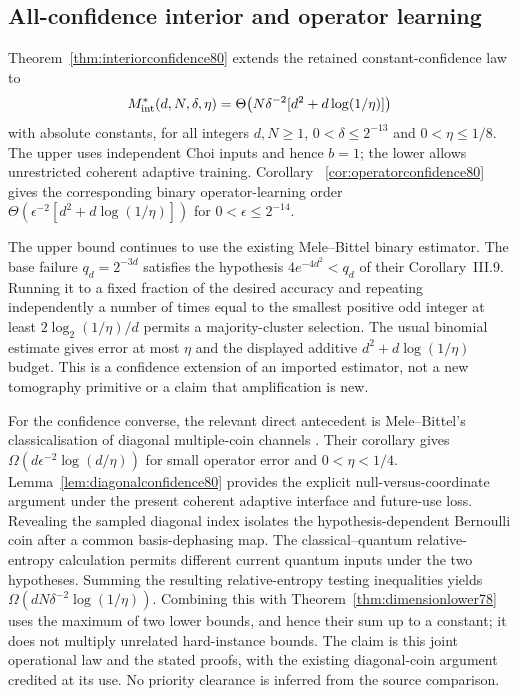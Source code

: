 \subsection{All-confidence interior and operator learning}
Theorem~\ref{thm:interiorconfidence80} extends the retained
constant-confidence law to
\[
 M^*_{\rm int}(d,N,\delta,\eta)
 =\Theta\!\left(N\delta^{-2}
             [d^2+d\log(1/\eta)]\right)
\]
with absolute constants, for all integers $d,N\ge1$,
$0<\delta\le2^{-13}$ and $0<\eta\le1/8$.
The upper uses independent Choi inputs and hence $b=1$; the lower
allows unrestricted coherent adaptive training. Corollary~
\ref{cor:operatorconfidence80} gives the corresponding binary
operator-learning order
$\Theta(\epsilon^{-2}[d^2+d\log(1/\eta)])$ for
$0<\epsilon\le2^{-14}$.

The upper bound continues to use the existing Mele--Bittel binary
estimator. The base failure $q_d=2^{-3d}$ satisfies the hypothesis
$4e^{-4d^2}<q_d$ of their Corollary~III.9. Running it to a fixed
fraction of the desired accuracy and repeating independently a number of times equal to the smallest positive odd
integer at least $2\log_2(1/\eta)/d$ permits a majority-cluster
selection. The usual binomial estimate gives error at most $\eta$
and the displayed additive $d^2+d\log(1/\eta)$ budget. This is a
confidence extension of an imported estimator, not a new tomography
primitive or a claim that amplification is new.

For the confidence converse, the relevant direct antecedent is
Mele--Bittel's classicalisation of diagonal multiple-coin channels
\cite[Lemma~IV.19 and Corollary~IV.20]{MB67}. Their corollary gives
$\Omega(d\epsilon^{-2}\log(d/\eta))$ for small operator error
and $0<\eta<1/4$. Lemma~\ref{lem:diagonalconfidence80}
provides the explicit null-versus-coordinate argument under the
present coherent adaptive interface and future-use loss. Revealing
the sampled diagonal index isolates the hypothesis-dependent
Bernoulli coin after a common basis-dephasing map. The
classical--quantum relative-entropy calculation permits different
current quantum inputs under the two hypotheses. Summing the resulting
relative-entropy testing inequalities yields
$\Omega(dN\delta^{-2}\log(1/\eta))$.
Combining this with Theorem~\ref{thm:dimensionlower78} uses the
maximum of two lower bounds, and hence their sum up to a constant;
it does not multiply unrelated hard-instance bounds. The claim is
this joint operational law and the stated proofs, with the existing
diagonal-coin argument credited at its use. No priority clearance
is inferred from the source comparison.

